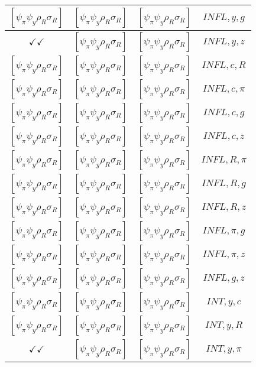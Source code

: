 \documentclass[a4paper,10pt]{article}
\begin{document}
\begin{longtable}{|c|c|c|c|}
\hline
$[\psi_\pi \psi_y \rho_R \sigma_R ]$ & $[\psi_\pi \psi_y \rho_R \sigma_R ]$ & $[\psi_\pi \psi_y \rho_R \sigma_R ]$ & ${INFL},{y},{g}$ \\
\hline
$\checkmark\checkmark$ & $[\psi_\pi \psi_y \rho_R \sigma_R ]$ & $[\psi_\pi \psi_y \rho_R \sigma_R ]$ & ${INFL},{y},{z}$ \\
\hline
$[\psi_\pi \psi_y \rho_R \sigma_R ]$ & $[\psi_\pi \psi_y \rho_R \sigma_R ]$ & $[\psi_\pi \psi_y \rho_R \sigma_R ]$ & ${INFL},{c},{R}$ \\
\hline
$[\psi_\pi \psi_y \rho_R \sigma_R ]$ & $[\psi_\pi \psi_y \rho_R \sigma_R ]$ & $[\psi_\pi \psi_y \rho_R \sigma_R ]$ & ${INFL},{c},{\pi}$ \\
\hline
$[\psi_\pi \psi_y \rho_R \sigma_R ]$ & $[\psi_\pi \psi_y \rho_R \sigma_R ]$ & $[\psi_\pi \psi_y \rho_R \sigma_R ]$ & ${INFL},{c},{g}$ \\
\hline
$[\psi_\pi \psi_y \rho_R \sigma_R ]$ & $[\psi_\pi \psi_y \rho_R \sigma_R ]$ & $[\psi_\pi \psi_y \rho_R \sigma_R ]$ & ${INFL},{c},{z}$ \\
\hline
$[\psi_\pi \psi_y \rho_R \sigma_R ]$ & $[\psi_\pi \psi_y \rho_R \sigma_R ]$ & $[\psi_\pi \psi_y \rho_R \sigma_R ]$ & ${INFL},{R},{\pi}$ \\
\hline
$[\psi_\pi \psi_y \rho_R \sigma_R ]$ & $[\psi_\pi \psi_y \rho_R \sigma_R ]$ & $[\psi_\pi \psi_y \rho_R \sigma_R ]$ & ${INFL},{R},{g}$ \\
\hline
$[\psi_\pi \psi_y \rho_R \sigma_R ]$ & $[\psi_\pi \psi_y \rho_R \sigma_R ]$ & $[\psi_\pi \psi_y \rho_R \sigma_R ]$ & ${INFL},{R},{z}$ \\
\hline
$[\psi_\pi \psi_y \rho_R \sigma_R ]$ & $[\psi_\pi \psi_y \rho_R \sigma_R ]$ & $[\psi_\pi \psi_y \rho_R \sigma_R ]$ & ${INFL},{\pi},{g}$ \\
\hline
$[\psi_\pi \psi_y \rho_R \sigma_R ]$ & $[\psi_\pi \psi_y \rho_R \sigma_R ]$ & $[\psi_\pi \psi_y \rho_R \sigma_R ]$ & ${INFL},{\pi},{z}$ \\
\hline
$[\psi_\pi \psi_y \rho_R \sigma_R ]$ & $[\psi_\pi \psi_y \rho_R \sigma_R ]$ & $[\psi_\pi \psi_y \rho_R \sigma_R ]$ & ${INFL},{g},{z}$ \\
\hline
$[\psi_\pi \psi_y \rho_R \sigma_R ]$ & $[\psi_\pi \psi_y \rho_R \sigma_R ]$ & $[\psi_\pi \psi_y \rho_R \sigma_R ]$ & ${INT},{y},{c}$ \\
\hline
$[\psi_\pi \psi_y \rho_R \sigma_R ]$ & $[\psi_\pi \psi_y \rho_R \sigma_R ]$ & $[\psi_\pi \psi_y \rho_R \sigma_R ]$ & ${INT},{y},{R}$ \\
\hline
$\checkmark\checkmark$ & $[\psi_\pi \psi_y \rho_R \sigma_R ]$ & $[\psi_\pi \psi_y \rho_R \sigma_R ]$ & ${INT},{y},{\pi}$ \\

\end{longtable}
\end{document}

